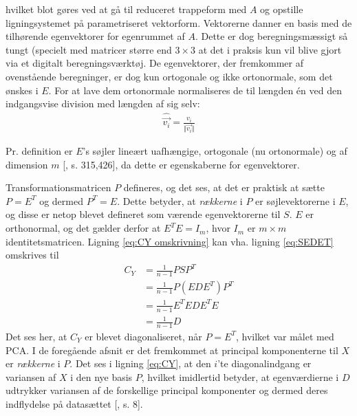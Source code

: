 hvilket blot gøres ved at gå til reduceret trappeform med $A$ og opstille ligningsystemet på parametriseret vektorform. Vektorerne danner en basis med de tilhørende egenvektorer for egenrummet af $A$. Dette er dog beregningsmæssigt så tungt (specielt med matricer større end $3 \times 3$ at det i praksis kun vil blive gjort via et digitalt beregningsværktøj. De egenvektorer, der fremkommer af ovenstående beregninger, er dog kun ortogonale og ikke ortonormale, som det ønskes i $E$. For at lave dem ortonormale normaliseres de til længden én ved den indgangsvise division med længden af sig selv:
\begin{align}
\hat{\vec{v_i}} = \frac{v_i}{\Vert\vec{v_i}\Vert}
\label{eq:ortonormal}
\end{align}

Pr. definition er $E$'s søjler lineært uafhængige, ortogonale (nu ortonormale) og af dimension $m$ [\citet{linalg}, s. 315,426], da dette er egenskaberne for egenvektorer.

Transformationsmatricen $P$ defineres, og det ses, at det er praktisk at sætte $P = E^T$ og dermed $P^T = E$. Dette betyder, at \emph{rækkerne} i $P$ er søjlevektorerne i $E$, og disse er netop blevet defineret som værende egenvektorerne til $S$. $E$ er orthonormal, og det gælder derfor at $E^TE = I_m$, hvor $I_m$ er $m \times m$ identitetsmatricen. Ligning \ref{eq:CY omskrivning} kan vha. ligning \ref{eq:SEDET} omskrives til
\begin{align}
C_Y 	& = \frac{1}{n-1} PSP^T \		\nonumber	\\
	& = \frac{1}{n-1} P(EDE^T)P^T	\nonumber	\\
	& = \frac{1}{n-1} E^TEDE^TE		\nonumber	\\
	& = \frac{1}{n-1} D
\label{eq:CY}
\end{align}
Det ses her, at $C_Y$ er blevet diagonaliseret, når $P=E^T$, hvilket var målet med PCA. I de foregående afsnit er det fremkommet at principal komponenterne til $X$ er \emph{rækkerne} i $P$. Det ses i ligning \ref{eq:CY}, at den $i$'te diagonalindgang er variansen af $X$ i den nye basis $P$, hvilket imidlertid betyder, at egenværdierne i $D$ udtrykker variansen af de forskellige principal komponenter og dermed deres indflydelse på datasættet [\citet{PCA_people}, s. 8].




